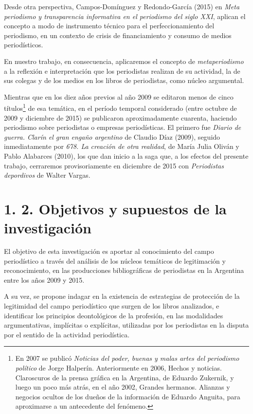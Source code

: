 Desde otra perspectiva, Campos-Domínguez y Redondo-García (2015) en \emph{Meta periodismo y transparencia informativa en el periodismo del siglo XXI}, aplican el concepto a modo de instrumento técnico para el perfeccionamiento del periodismo, en un contexto de crisis de financiamiento y consumo de medios periodísticos.

En nuestro trabajo, en consecuencia, aplicaremos el concepto de \emph{metaperiodismo} a la reflexión e interpretación que los periodistas realizan de su actividad, la de sus colegas y de los medios en los libros de periodistas, como núcleo argumental.

Mientras que en los diez años previos al año 2009 se editaron menos de cinco títulos\footnote{En 2007 se publicó \emph{Noticias del poder, buenas y malas artes del periodismo político} de Jorge Halperín. Anteriormente en 2006, Hechos y noticias. Claroscuros de la prensa gráfica en la Argentina, de Eduardo Zukernik, y luego un poco más atrás, en el año 2002, Grandes hermanos. Alianzas y negocios ocultos de los dueños de la información de Eduardo Anguita, para aproximarse a un antecedente del fenómeno.} de esa temática, en el período temporal considerado (entre octubre de 2009 y diciembre de 2015) se publicaron aproximadamente cuarenta, haciendo periodismo sobre periodistas o empresas periodísticas. El primero fue \emph{Diario de guerra. Clarín el gran engaño argentino} de Claudio Díaz (2009), seguido inmediatamente por \emph{678. La creación de otra realidad}, de María Julia Oliván y Pablo Alabarces (2010), los que dan inicio a la saga que, a los efectos del presente trabajo, cerraremos provisoriamente en diciembre de 2015 con \emph{Periodistas depordivos} de Walter Vargas. \protect\hypertarget{_Toc50463137}{}{}

\section{1. 2. Objetivos y supuestos de la investigación}

El objetivo de esta investigación es aportar al conocimiento del campo periodístico a través del análisis de los núcleos temáticos de legitimación y reconocimiento, en las producciones bibliográficas de periodistas en la Argentina entre los años 2009 y 2015.

A su vez, se propone indagar en la existencia de estrategias de protección de la legitimidad del campo periodístico que surgen de los libros analizados, e identificar los principios deontológicos de la profesión, en las modalidades argumentativas, implícitas o explícitas, utilizadas por los periodistas en la disputa por el sentido de la actividad periodística.

